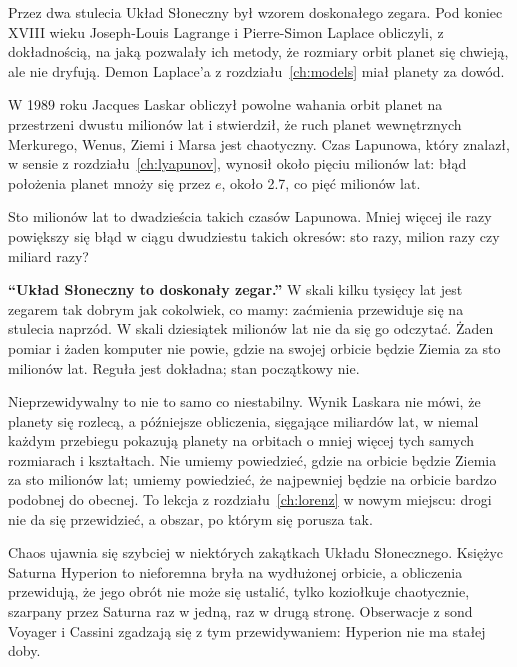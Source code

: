 \noindent
Przez dwa stulecia Układ Słoneczny był wzorem doskonałego zegara. Pod koniec
XVIII wieku Joseph-Louis Lagrange i Pierre-Simon Laplace obliczyli, z
dokładnością, na jaką pozwalały ich metody, że rozmiary orbit planet się
chwieją, ale nie dryfują. Demon Laplace'a z rozdziału~\ref{ch:models} miał
planety za dowód.

W 1989 roku Jacques Laskar obliczył powolne wahania orbit planet na
przestrzeni dwustu milionów lat i stwierdził, że ruch planet wewnętrznych
\dash{} Merkurego, Wenus, Ziemi i Marsa \dash{} jest chaotyczny. Czas
Lapunowa, który znalazł, w sensie z rozdziału~\ref{ch:lyapunov}, wynosił
około pięciu milionów lat: błąd położenia planet mnoży się przez $e$, około
\num{2.7}, co pięć milionów lat.

\begin{think}
Sto milionów lat to dwadzieścia takich czasów Lapunowa. Mniej więcej ile
razy powiększy się błąd w ciągu dwudziestu takich okresów: sto razy, milion
razy czy miliard razy?
\end{think}

\begin{trapbox}
\textbf{\enquote{Układ Słoneczny to doskonały zegar.}} W skali kilku tysięcy
lat jest zegarem tak dobrym jak cokolwiek, co mamy: zaćmienia przewiduje się
na stulecia naprzód. W skali dziesiątek milionów lat nie da się go odczytać.
Żaden pomiar i żaden komputer nie powie, gdzie na swojej orbicie będzie
Ziemia za sto milionów lat. Reguła jest dokładna; stan początkowy nie.
\end{trapbox}

\noindent
Nieprzewidywalny to nie to samo co niestabilny. Wynik Laskara nie mówi, że
planety się rozlecą, a późniejsze obliczenia, sięgające miliardów lat, w
niemal każdym przebiegu pokazują planety na orbitach o mniej więcej tych
samych rozmiarach i kształtach. Nie umiemy powiedzieć, gdzie na orbicie
będzie Ziemia za sto milionów lat; umiemy powiedzieć, że najpewniej będzie na
orbicie bardzo podobnej do obecnej. To lekcja z rozdziału~\ref{ch:lorenz} w
nowym miejscu: drogi nie da się przewidzieć, a obszar, po którym się porusza
\dash{} tak.

Chaos ujawnia się szybciej w niektórych zakątkach Układu Słonecznego. Księżyc
Saturna Hyperion to nieforemna bryła na wydłużonej orbicie, a obliczenia
przewidują, że jego obrót nie może się ustalić, tylko koziołkuje
chaotycznie, szarpany przez Saturna raz w jedną, raz w drugą stronę.
Obserwacje z sond Voyager i Cassini zgadzają się z tym przewidywaniem:
Hyperion nie ma stałej doby.

